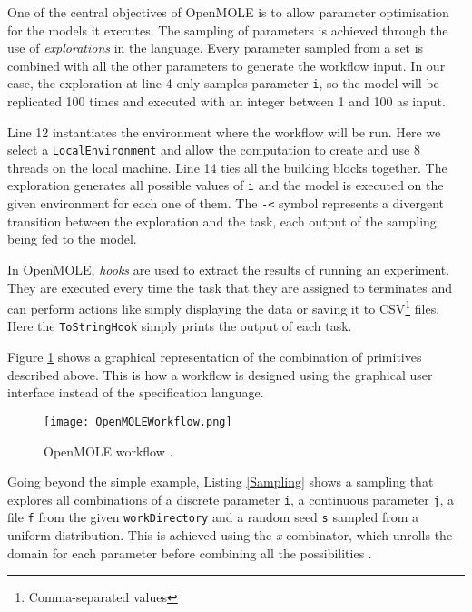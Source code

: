 One of the central objectives of OpenMOLE is to allow parameter optimisation for the models it executes. The sampling of parameters is achieved through the use of \textit{explorations} in the language. Every parameter sampled from a set is combined with all the other parameters to generate the workflow input. In our case, the exploration at line 4 only samples parameter \verb|i|, so the model will be replicated 100 times and executed with an integer between 1 and 100 as input.

Line 12 instantiates the environment where the workflow will be run. Here we select a \verb|LocalEnvironment| and allow the computation to create and use 8 threads on the local machine. Line 14 ties all the building blocks together. The exploration generates all possible values of \verb|i| and the model is executed on the given environment for each one of them. The \verb|-<| symbol represents a divergent transition between the exploration and the task, each output of the sampling being fed to the model.

In OpenMOLE, \textit{hooks} are used to extract the results of running an experiment. They are executed every time the task that they are assigned to terminates and can perform actions like simply displaying the data or saving it to CSV\footnote{Comma-separated values} files. Here the \verb|ToStringHook| simply prints the output of each task.

Figure \ref{OpenMOLEWorkflow} shows a graphical representation of the combination of primitives described above. This is how a workflow is designed using the graphical user interface instead of the specification language.

\begin{figure}[h]
	\centering
		\texttt{[image: OpenMOLEWorkflow.png]}
	\caption{OpenMOLE workflow \cite{OpenMOLE}.}
	\label{OpenMOLEWorkflow}
\end{figure}

Going beyond the simple example, Listing \ref{Sampling} shows a sampling that explores all combinations of a discrete parameter \verb|i|, a continuous parameter \verb|j|, a file \verb|f| from the given \verb|workDirectory| and a random seed \verb|s| sampled from a uniform distribution. This is achieved using the \textit{x} combinator, which unrolls the domain for each parameter before combining all the possibilities \cite{OpenMOLEDSL}.




